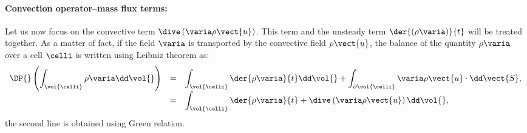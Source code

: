 \paragraph{Convection operator--mass flux terms:}
 Let us now focus on the convective term $\dive \left( \varia \rho \vect{u}\right)$. This term and the
 unsteady term $ \der{ \left( \rho \varia \right) }{ t} $ will be treated
 together. As a matter of fact, if the field $\varia$ is transported by the convective field $\rho \vect{u}$, the balance
 of the quantity $\rho \varia$ over a cell $\celli$ is written using Leibniz theorem as:
 \begin{equation}\label{eq:spadis:leibnitz_th}
\begin{array}{r c l}
\displaystyle \DP{} \left( \int_{\vol{\celli}} \rho \varia \dd \vol{}\right) &=& 
\displaystyle \int_{\vol{\celli}} \der{\rho \varia}{t} \dd \vol{} + \int_{\partial \vol{\celli}} \varia \rho \vect{u} \cdot  \dd \vect{S}, \\
\displaystyle &=&
\displaystyle \int_{\vol{\celli}} \der{\rho \varia}{t} + \dive \left( \varia \rho \vect{u} \right)  \dd \vol{},
\end{array}
 \end{equation}
the second line is obtained using Green relation. 
 
